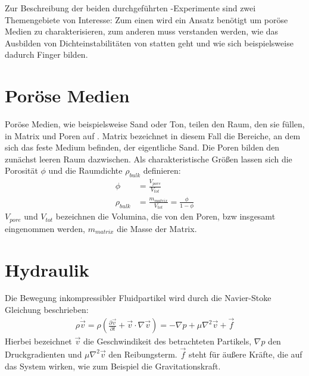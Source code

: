 \label{cha:theo}

Zur Beschreibung der beiden durchgeführten \HSCs-Experimente sind zwei Themengebiete von Interesse: Zum einen wird ein Ansatz benötigt um poröse Medien zu charakterisieren, zum anderen muss verstanden werden, wie das Ausbilden von Dichteinstabilitäten von statten geht und wie sich beispielsweise dadurch Finger bilden.

\section{Poröse Medien}
\label{sec:por}
Poröse Medien, wie beispielsweise Sand oder Ton, teilen den Raum, den sie füllen, in Matrix und Poren auf \citep{roth2005}.  Matrix bezeichnet in diesem Fall die Bereiche, an dem sich das feste Medium befinden, der eigentliche Sand. Die Poren bilden den zunächst leeren Raum dazwischen.
Als charakteristische Größen lassen sich die Porosität $\phi$ und die Raumdichte $\rho_{bulk}$ definieren:
\begin{align}
 \phi &= \frac{V_{pore}}{V_{tot}} \\
 \rho_{bulk} &= \frac{m_{matrix}}{V_{tot}} = \frac{\phi}{1-\phi}
\end{align}
$V_{pore}$ und $V_{tot}$ bezeichnen die Volumina, die von den Poren, bzw insgesamt eingenommen werden, $m_{matrix}$ die Masse der Matrix. 

\section{Hydraulik}
\label{sec:hyd}
Die Bewegung inkompressibler Fluidpartikel wird durch die Navier-Stoke Gleichung beschrieben:
\begin{eqnarray}
 \rho \dot{\vec{v}} = \rho \left( \frac{\partial \vec{v}}{\partial t} + \vec{v} \cdot \nabla \vec{v} \right) = - \nabla p + \mu \nabla^2 \vec{v} + \vec{f}
\end{eqnarray}
Hierbei bezeichnet $\vec{v}$ die Geschwindikeit des betrachteten Partikels, $\nabla p$ den Druckgradienten und $\mu \nabla^2 \vec{v}$ den Reibungsterm. $\vec{f}$ steht für äußere Kräfte, die auf das System wirken, wie zum Beispiel die Gravitationskraft. \citep{roth2005}



